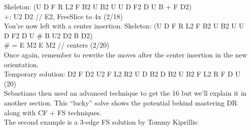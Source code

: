 \documentclass[11pt,a4paper]{book}
\newcommand{\p}{\textquotesingle}
\newcommand{\ps}{\p\,\,}
\begin{document}
\newline
Skeleton: (U D\ps F R L2 F\ps B2 U\ps B2 U\ps U D\ps F2 D U\ps B + F D2) \\
+: U2 D2 // E2, FreeSlice to 4x (2/18)\\
\newline
You're now left with a center insertion.
\newline
Skeleton: (U D\ps F R L2 F\ps B2 U\ps B2 U\ps U D\ps F2 D U\ps \# B U2 D2 B D2) \\
\# = E M2 E\ps M2 // centers (2/20)\\
\newline
Once again, remember to rewrite the moves after the center insertion in the new orientation.\\
\newline
Temporary solution: D2 F\ps D2 U2 F\ps L2 R2 U\ps D B2 D B2 U B2 F L2 R\ps F\ps D U\ps (20) \\
\newline
Sebastiano then used an advanced technique to get the 16 but we'll explain it in another section.
This “lucky” solve shows the potential behind mastering DR along with CF + FS techniques. \\
\newline
The second example is a 3-edge FS solution by Tommy Kiprillis:\\
\end{document}
